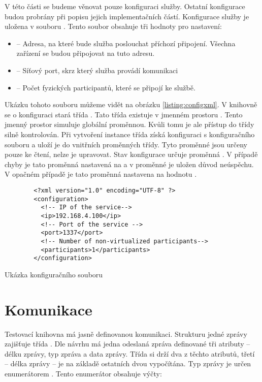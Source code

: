 V této části se budeme věnovat pouze konfiguraci služby. Ostatní konfigurace budou probrány při popisu jejich implementačních částí. Konfigurace služby je uložena v souboru . Tento soubor obsahuje tři hodnoty pro nastavení:

\begin{itemize}
    \item {} -- Adresa, na které bude služba poslouchat příchozí připojení. Všechna zařízení se budou připojovat na tuto adresu.
    \item {} -- Síťový port, skrz který služba provádí komunikaci
    \item {} -- Počet fyzických participantů, které se připojí ke službě.   
\end{itemize}

Ukázku tohoto souboru můžeme vidět na obrázku \ref{listing:configxml}. V knihovně se o konfiguraci stará třída . Tato třída existuje v jmenném prostoru . Tento jmenný prostor simuluje globální proměnnou. Kvůli tomu je ale přístup do třídy silně kontrolován. Při vytvoření instance třída získá konfiguraci s konfiguračního souboru a uloží je do vnitřních proměnných třídy. Tyto proměnné jsou určeny pouze ke čtení, nelze je upravovat. Stav konfigurace určuje proměnná . V případě chyby je tato proměnná nastavená na  a v proměnné  je uložen důvod neúspěchu. V opačném případě je tato proměnná nastavena na hodnotu .


\begin{listing}
    \begin{verbatim}
        <?xml version="1.0" encoding="UTF-8" ?>
        <configuration>
          <!-- IP of the service-->
          <ip>192.168.4.100</ip>
          <!-- Port of the service -->
          <port>1337</port>
          <!-- Number of non-virtualized participants-->
          <participants>1</participants>
        </configuration>
    \end{verbatim}
    \caption{Ukázka konfiguračního souboru}
    \label{listing:configxml}
\end{listing}

\section{Komunikace}
Testovací knihovna má jasně definovanou komunikaci. Strukturu jedné zprávy zajišťuje třída . Dle návrhu má jedna odeslaná zpráva definované tři atributy -- délku zprávy, typ zpráva a data zprávy. Třída  si drží dva z těchto atributů, třetí -- délka zprávy -- je na základě ostatních dvou vypočítána. Typ zprávy je určen enumerátorem . Tento enumerátor obsahuje výčty:

